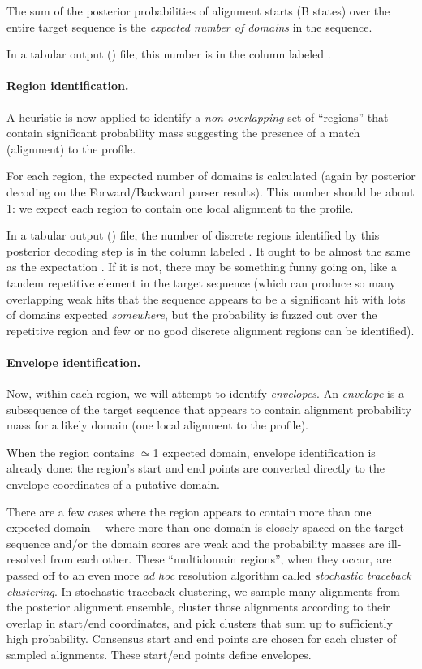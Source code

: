 The sum of the posterior probabilities of alignment starts (B states)
over the entire target sequence is the \emph{expected number of
  domains} in the sequence.

In a tabular output () file, this number is in the
column labeled .

\paragraph{Region identification.}

A heuristic is now applied to identify a \emph{non-overlapping} set of
``regions'' that contain significant probability mass suggesting the
presence of a match (alignment) to the profile.

For each region, the expected number of domains is calculated (again
by posterior decoding on the Forward/Backward parser results). This
number should be about 1: we expect each region to contain one local
alignment to the profile. 

In a tabular output () file, the number of discrete
regions identified by this posterior decoding step is in the column
labeled . It ought to be almost the same as the expectation
. If it is not, there may be something funny going on, like
a tandem repetitive element in the target sequence (which can produce
so many overlapping weak hits that the sequence appears to be a
significant hit with lots of domains expected \emph{somewhere}, but
the probability is fuzzed out over the repetitive region and few or no
good discrete alignment regions can be identified).

\paragraph{Envelope identification.}

Now, within each region, we will attempt to identify \emph{envelopes}.
An \emph{envelope} is a subsequence of the target sequence that
appears to contain alignment probability mass for a likely domain (one
local alignment to the profile).

When the region contains $\simeq$1 expected domain, envelope
identification is already done: the region's start and end points are
converted directly to the envelope coordinates of a putative domain.

There are a few cases where the region appears to contain more than
one expected domain -{}- where more than one domain is closely spaced on
the target sequence and/or the domain scores are weak and the
probability masses are ill-resolved from each other. These
``multidomain regions'', when they occur, are passed off to an even
more \emph{ad hoc} resolution algorithm called \emph{stochastic
  traceback clustering}. In stochastic traceback clustering, we sample
many alignments from the posterior alignment ensemble, cluster those
alignments according to their overlap in start/end coordinates, and
pick clusters that sum up to sufficiently high probability. Consensus
start and end points are chosen for each cluster of sampled
alignments. These start/end points define envelopes.

